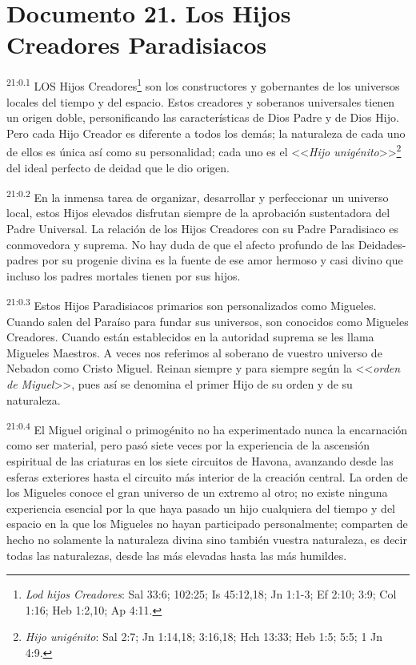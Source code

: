 \chapter{Documento 21. Los Hijos Creadores Paradisiacos}
\par
\textsuperscript{21:0.1} LOS Hijos Creadores\footnote{\textit{Lod hijos Creadores}: Sal 33:6; 102:25; Is 45:12,18; Jn 1:1-3; Ef 2:10; 3:9; Col 1:16; Heb 1:2,10; Ap 4:11.} son los constructores y gobernantes de los universos locales del tiempo y del espacio. Estos creadores y soberanos universales tienen un origen doble, personificando las características de Dios Padre y de Dios Hijo. Pero cada Hijo Creador es diferente a todos los demás; la naturaleza de cada uno de ellos es única así como su personalidad; cada uno es el <<\textit{Hijo unigénito}>>\footnote{\textit{Hijo unigénito}: Sal 2:7; Jn 1:14,18; 3:16,18; Hch 13:33; Heb 1:5; 5:5; 1 Jn 4:9.} del ideal perfecto de deidad que le dio origen.

\par
\textsuperscript{21:0.2} En la inmensa tarea de organizar, desarrollar y perfeccionar un universo local, estos Hijos elevados disfrutan siempre de la aprobación sustentadora del Padre Universal. La relación de los Hijos Creadores con su Padre Paradisiaco es conmovedora y suprema. No hay duda de que el afecto profundo de las Deidades-padres por su progenie divina es la fuente de ese amor hermoso y casi divino que incluso los padres mortales tienen por sus hijos.

\par
\textsuperscript{21:0.3} Estos Hijos Paradisiacos primarios son personalizados como Migueles. Cuando salen del Paraíso para fundar sus universos, son conocidos como Migueles Creadores. Cuando están establecidos en la autoridad suprema se les llama Migueles Maestros. A veces nos referimos al soberano de vuestro universo de Nebadon como Cristo Miguel. Reinan siempre y para siempre según la <<\textit{orden de Miguel}>>, pues así se denomina el primer Hijo de su orden y de su naturaleza.

\par
\textsuperscript{21:0.4} El Miguel original o primogénito no ha experimentado nunca la encarnación como ser material, pero pasó siete veces por la experiencia de la ascensión espiritual de las criaturas en los siete circuitos de Havona, avanzando desde las esferas exteriores hasta el circuito más interior de la creación central. La orden de los Migueles conoce el gran universo de un extremo al otro; no existe ninguna experiencia esencial por la que haya pasado un hijo cualquiera del tiempo y del espacio en la que los Migueles no hayan participado personalmente; comparten de hecho no solamente la naturaleza divina sino también vuestra naturaleza, es decir todas las naturalezas, desde las más elevadas hasta las más humildes.

